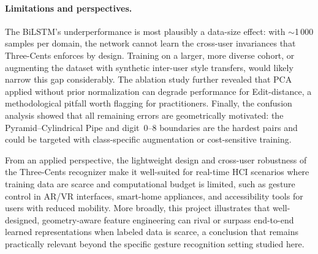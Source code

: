 \paragraph{Limitations and perspectives.}
The BiLSTM's underperformance is most plausibly a data-size effect: with
$\sim$1\,000 samples per domain, the network cannot learn the cross-user
invariances that Three-Cents enforces by design. Training on a larger,
more diverse cohort, or augmenting the dataset with synthetic inter-user
style transfers, would likely narrow this gap considerably. The ablation
study further revealed that PCA applied without prior normalization can
degrade performance for Edit-distance, a methodological pitfall worth
flagging for practitioners. Finally, the confusion analysis showed that
all remaining errors are geometrically motivated: the Pyramid--Cylindrical
Pipe and digit~0--8 boundaries are the hardest pairs and could be targeted
with class-specific augmentation or cost-sensitive training.

From an applied perspective, the lightweight design and cross-user robustness
of the Three-Cents recognizer make it well-suited for real-time HCI scenarios
where training data are scarce and computational budget is limited, such as
gesture control in AR/VR interfaces, smart-home appliances, and accessibility
tools for users with reduced mobility.
More broadly, this project illustrates that well-designed, geometry-aware
feature engineering can rival or surpass end-to-end learned representations
when labeled data is scarce, a conclusion that remains practically relevant
beyond the specific gesture recognition setting studied here.
